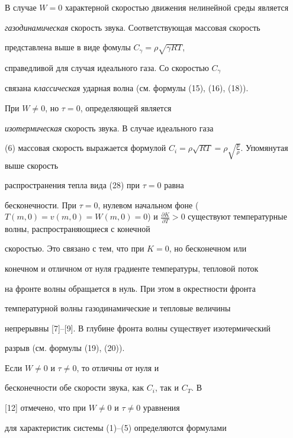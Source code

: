 В случае $W=0$ характерной скоростью движения нелинейной среды является


{\it газодинамическая} скорость звука. Соответствующая массовая скорость


представлена выше в виде фомулы $C_{\gamma} = {\rho}\sqrt {{\gamma}RT}$,


справедливой для случая идеального газа. Со скоростью $C_{\gamma}$


связана {\it классическая} ударная волна (см. формулы (15), (16), (18)).





При $W \neq 0$, но $\tau = 0$, определяющей является


{\it изотермическая} скорость звука. В случае идеального газа


(6) массовая скорость выражается формулой $C_{i}= {\rho} \sqrt


{RT} = \rho\sqrt {\frac {p}{\rho}}$. Упомянутая выше скорость


распространения тепла вида (28) при $\tau = 0$ равна


бесконечности. При $\tau = 0$, нулевом начальном фоне ($T(m,0) =


{ v } (m,0) = W(m,0)=0$) и $\frac {\partial K}{\partial T} >


0$ существуют температурные волны, распространяющиеся с конечной


скоростью. Это связано с тем, что при $K=0$, но бесконечном или


конечном и отличном от нуля градиенте температуры, тепловой поток


на фронте волны обращается в нуль. При этом в окрестности фронта


температурной волны газодинамические и тепловые величины


непрерывны [7]--[9]. В глубине фронта волны существует изотермический


разрыв (см. формулы (19), (20)).





Если $W \neq 0$ и $\tau \neq 0$, то отличны от нуля и


бесконечности обе скорости звука, как $C_{i}$, так и $C_{T}$. В


[12] отмечено, что при $W \neq 0$ и $\tau \neq 0$ уравнения


для характеристик системы (1)--(5) определяются формулами


$$


